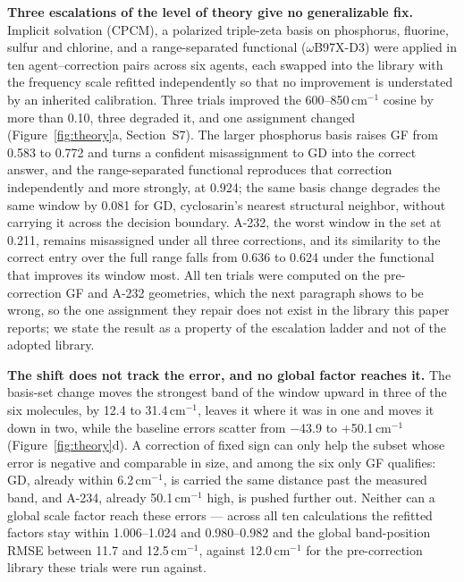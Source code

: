 \documentclass[review,12pt]{elsarticle}
\newcommand*\wn{\ensuremath{\text{cm}^{-1}}}
\begin{document}
\textbf{Three escalations of the level of theory give no generalizable fix.} Implicit
solvation (CPCM), a polarized triple-zeta basis on phosphorus, fluorine, sulfur and
chlorine, and a range-separated functional ($\omega$B97X-D3) were applied in ten
agent--correction pairs across six agents, each swapped into the library with the frequency
scale refitted independently so that no improvement is understated by an inherited
calibration. Three trials improved the 600--850\,\wn{} cosine by more than 0.10, three
degraded it, and one assignment changed (Figure~\ref{fig:theory}a, Section~S7). The larger
phosphorus basis raises GF from 0.583 to 0.772 and turns a confident misassignment to GD
into the correct answer, and the range-separated functional reproduces that correction
independently and more strongly, at 0.924; the same basis change degrades the same window
by 0.081 for GD, cyclosarin's nearest structural neighbor, without carrying it across the
decision boundary. A-232, the worst window in the set at 0.211, remains misassigned under
all three corrections, and its similarity to the correct entry over the full range falls
from 0.636 to 0.624 under the functional that improves its window most. All ten trials
were computed on the pre-correction GF and A-232 geometries, which the next paragraph shows
to be wrong, so the one assignment they repair does not exist in the library this paper
reports; we state the result as a property of the escalation ladder and not of the adopted
library.

\textbf{The shift does not track the error, and no global factor reaches it.} The
basis-set change moves the strongest band of the window upward in three of the six
molecules, by 12.4 to 31.4\,\wn{}, leaves it where it was in one and moves it down in two,
while the baseline errors scatter from $-$43.9 to $+$50.1\,\wn{}
(Figure~\ref{fig:theory}d). A correction of fixed sign can only help the subset whose error
is negative and comparable in size, and among the six only GF qualifies: GD, already within
6.2\,\wn{}, is carried the same distance past the measured band, and A-234, already
50.1\,\wn{} high, is pushed further out. Neither can a global scale factor reach these
errors --- across all ten calculations the refitted factors stay within 1.006--1.024 and
0.980--0.982 and the global band-position RMSE between 11.7 and 12.5\,\wn{}, against
12.0\,\wn{} for the pre-correction library these trials were run against.
\end{document}
